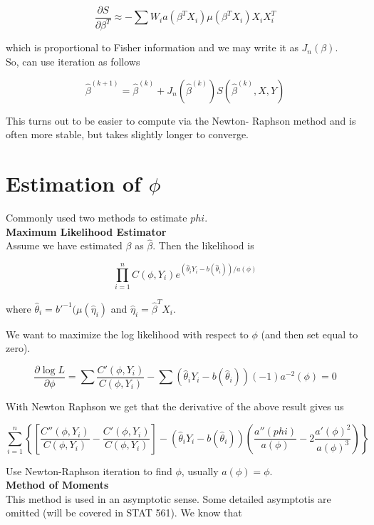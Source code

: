 \documentclass[11pt,fleqn]{book} %
\begin{document}
		$$\frac{\partial S}{\partial \beta^T} \approx - \sum W_i a(\beta^T X_i)\mu(\beta^TX_i) X_i X_i^T $$

which is proportional to Fisher information and we may write it as $J_n(\beta)$.\\

So, can use iteration as follows

		$$\hat{\beta}^{(k+1)} = \hat{\beta}^{(k)} + J_n(\hat{\beta}^{(k)}) S(\hat{\beta}^{(k)}, X, Y) $$

This turns out to be easier to compute via the Newton- Raphson method and is often more stable, but takes slightly longer to converge. 

\section{Estimation of $\phi$}

Commonly used two methods to estimate $phi$. \\

\textbf{Maximum Likelihood Estimator}\\

Assume we have estimated $\beta$ as $\hat{\beta}$. Then the likelihood is

		$$\prod^n_{i=1} C(\phi, Y_i) e^{(\hat{\theta}_i Y_i - b(\hat{\theta}_i))/a(\phi)} $$

where $\hat{\theta}_i = b'^{-1}(\mu(\hat{\eta}_i)$ and $\hat{\eta}_i = \hat{\beta}^T X_i$.


We want to maximize the log likelihood with respect to $\phi$  (and then set equal to zero). 

		$$\frac{\partial \log L}{\partial \phi} = \sum \frac{C'(\phi, Y_i)}{C(\phi, Y_i)} - \sum (\hat{\theta}_i Y_i - b(\hat{\theta}_i))(-1)a^{-2}(\phi) = 0$$


With Newton Raphson we get that the derivative of the above result gives us

		$$\sum^n_{i=1} \left\{ \left[\frac{C''(\phi, Y_i)}{C(\phi, Y_i)} - \frac{C'(\phi, Y_i)}{C(\phi, Y_i)} \right] - (\hat{\theta}_i Y_i - b(\hat{\theta}_i)) \left(\frac{a''(phi)}{a(\phi)} - 2\frac{a'(\phi)^2}{a(\phi)^3} \right) \right\} $$

	Use Newton-Raphson iteration to find $\phi$, usually $a(\phi)= \phi$.\\

\textbf{Method of Moments}\\

This method is used in an asymptotic sense. Some detailed asymptotis are omitted (will be covered in STAT 561). We know that 
\end{document}
